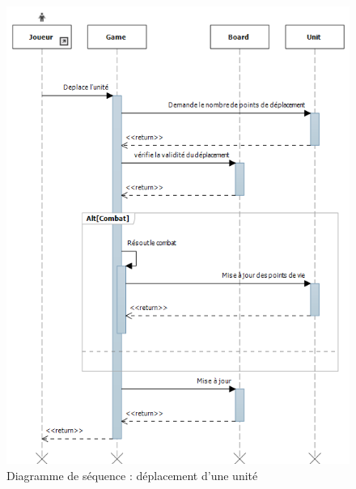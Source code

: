 \begin{figure}[!h]
\centering
\includegraphics[width=.9\textwidth]{Parties/Images/seq_DeplacementUnite.png}
\caption{Diagramme de séquence : déplacement d'une unité}
\label{fig:seq_DeplacementUnite}
\end{figure}
